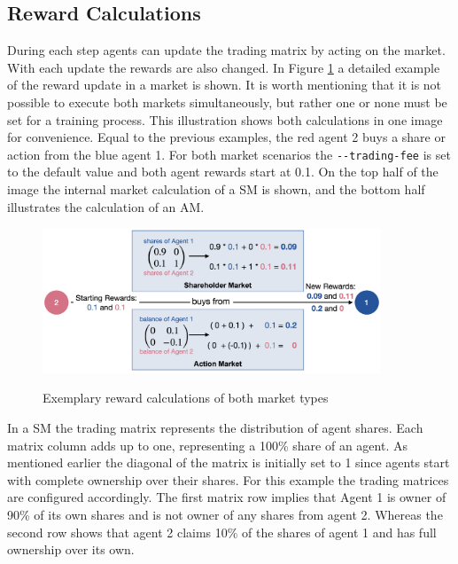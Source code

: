 \subsection{Reward Calculations}\label{market_reward_calc}
During each step agents can update the trading matrix by acting on the market. With each update the rewards are also changed. In Figure \ref{fig:market_rewards} a detailed example of the reward update in a market is shown. It is worth mentioning that it is not possible to execute both markets simultaneously, but rather one or none must be set for a training process. This illustration shows both calculations in one image for convenience. Equal to the previous examples, the red agent 2 buys a share or action from the blue agent 1. For both market scenarios the \verb|--trading-fee| is set to the default value and both agent rewards start at 0.1. On the top half of the image the internal market calculation of a SM is shown, and the bottom half illustrates the calculation of an AM.
\begin{figure}[hpbt]
    \centering
    \includegraphics[width=0.9\textwidth]{pictures/new_market_rewards}\\
    \caption[Exemplary Reward Calculation Of Markets]{Exemplary reward calculations of both market types}\label{fig:market_rewards}
\end{figure}

In a SM the trading matrix represents the distribution of agent shares. Each matrix column adds up to one, representing a 100\% share of an agent. As mentioned earlier the diagonal of the matrix is initially set to 1 since agents start with complete ownership over their shares. For this example the trading matrices are configured accordingly. The first matrix row implies that Agent 1 is owner of 90\% of its own shares and is not owner of any shares from agent 2. Whereas the second row shows that agent 2 claims 10\% of the shares of agent 1 and has full ownership over its own.

